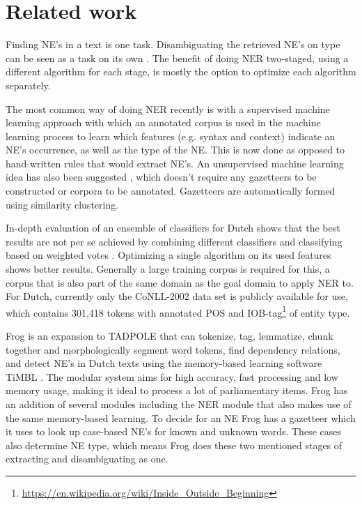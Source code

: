 \section{Related work} \label{sec:rel}
Finding NE's in a text is one task. Disambiguating the retrieved NE's on type can be seen as a task on its own \cite{buitinck2012two}. The benefit of doing NER two-staged, using a different algorithm for each stage, is mostly the option to optimize each algorithm separately.  

The most common way of doing NER recently is with a supervised machine learning approach with which an annotated corpus is used in the machine learning process to learn which features (e.g. syntax and context) indicate an NE's occurrence, as well as the type of the NE. This is now done as opposed to hand-written rules that would extract NE's. An unsupervised machine learning idea has also been suggested \cite{kazama2008inducing}, which doesn't require any gazetteers to be constructed or corpora to be annotated. Gazetteers are automatically formed using similarity clustering.

In-depth evaluation of an ensemble of classifiers for Dutch shows that the best results are not per se achieved by combining different classifiers and classifying based on weighted votes \cite{desmet2014fine}. Optimizing a single algorithm on its used features shows better results. Generally a large training corpus is required for this, a corpus that is also part of the same domain as the goal domain to apply NER to. For Dutch, currently only the CoNLL-2002 data set is publicly available for use, which contains 301,418 tokens with annotated POS and IOB-tag\footnote{\url{https://en.wikipedia.org/wiki/Inside_Outside_Beginning}} of entity type.

Frog is an expansion to TADPOLE \cite{bosch2007efficient} that can tokenize, tag, lemmatize, chunk together and morphologically segment word tokens, find dependency relations, and detect NE's in Dutch texts using the memory-based learning software TiMBL \cite{daelemans2004timbl}. The modular system aims for high accuracy, fast processing and low memory usage, making it ideal to process a lot of parliamentary items. Frog has an addition of several modules including the NER module that also makes use of the same memory-based learning. To decide for an NE Frog has a gazetteer which it uses to look up case-based NE's for known and unknown words. These cases also determine NE type, which means Frog does these two mentioned stages of extracting and disambiguating as one.




